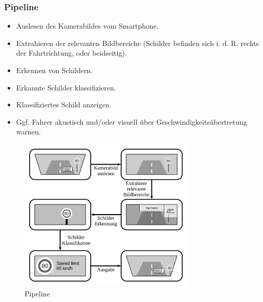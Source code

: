 \subsubsection*{Pipeline}
    \begin{itemize}
        \item Auslesen des Kamerabildes vom Smartphone.
        \item Extrahieren der relevanten Bildbereiche (Schilder befinden sich i. d. R. rechts der Fahrtrichtung, oder beidseitig).
        \item Erkennen von Schildern.
        \item Erkannte Schilder klassifizieren.
        \item Klassifiziertes Schild anzeigen.
        \item Ggf. Fahrer akustisch und/oder visuell über Geschwindigkeitsübertretung warnen.
    \end{itemize}
    \begin{figure}
            \centering
            \includegraphics[width=0.75\textwidth]{pipeline.pdf}
            \caption{Pipeline}
    \end{figure}
